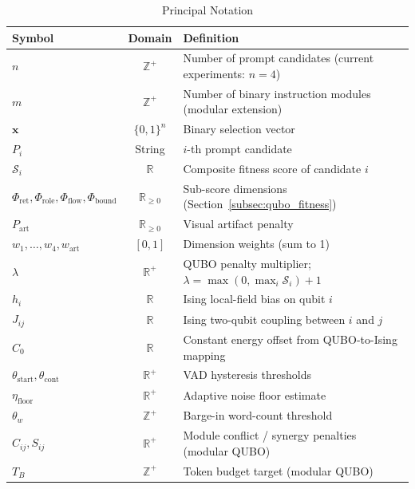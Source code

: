 \documentclass[11pt,a4paper]{article}
\begin{document}
\begin{table}[htbp]
\centering\small
\caption{Principal Notation}
\label{tab:notation}
\renewcommand{\arraystretch}{1.25}
\begin{tabularx}{\textwidth}{lcX}
\toprule
\textbf{Symbol} & \textbf{Domain} & \textbf{Definition} \\
\midrule
$n$ & $\mathbb{Z}^+$ & Number of prompt candidates (current experiments: $n=4$) \\
$m$ & $\mathbb{Z}^+$ & Number of binary instruction modules (modular extension) \\
$\mathbf{x}$ & $\{0,1\}^n$ & Binary selection vector \\
$P_i$ & String & $i$-th prompt candidate \\
$\mathcal{S}_i$ & $\mathbb{R}$ & Composite fitness score of candidate $i$ \\
$\Phi_{\text{ret}}, \Phi_{\text{role}}, \Phi_{\text{flow}}, \Phi_{\text{bound}}$ & $\mathbb{R}_{\ge 0}$ & Sub-score dimensions (Section~\ref{subsec:qubo_fitness}) \\
$P_{\text{art}}$ & $\mathbb{R}_{\ge 0}$ & Visual artifact penalty \\
$w_1,\ldots,w_4,w_{\text{art}}$ & $[0,1]$ & Dimension weights (sum to 1) \\
$\lambda$ & $\mathbb{R}^+$ & QUBO penalty multiplier; $\lambda = \max(0, \max_i \mathcal{S}_i) + 1$ \\
$h_i$ & $\mathbb{R}$ & Ising local-field bias on qubit $i$ \\
$J_{ij}$ & $\mathbb{R}$ & Ising two-qubit coupling between $i$ and $j$ \\
$C_0$ & $\mathbb{R}$ & Constant energy offset from QUBO-to-Ising mapping \\
$\theta_{\text{start}}, \theta_{\text{cont}}$ & $\mathbb{R}^+$ & VAD hysteresis thresholds \\
$\eta_{\text{floor}}$ & $\mathbb{R}^+$ & Adaptive noise floor estimate \\
$\theta_w$ & $\mathbb{Z}^+$ & Barge-in word-count threshold \\
$C_{ij}, S_{ij}$ & $\mathbb{R}^+$ & Module conflict / synergy penalties (modular QUBO) \\
$T_B$ & $\mathbb{Z}^+$ & Token budget target (modular QUBO) \\
\bottomrule
\end{tabularx}
\end{table}

\end{document}
